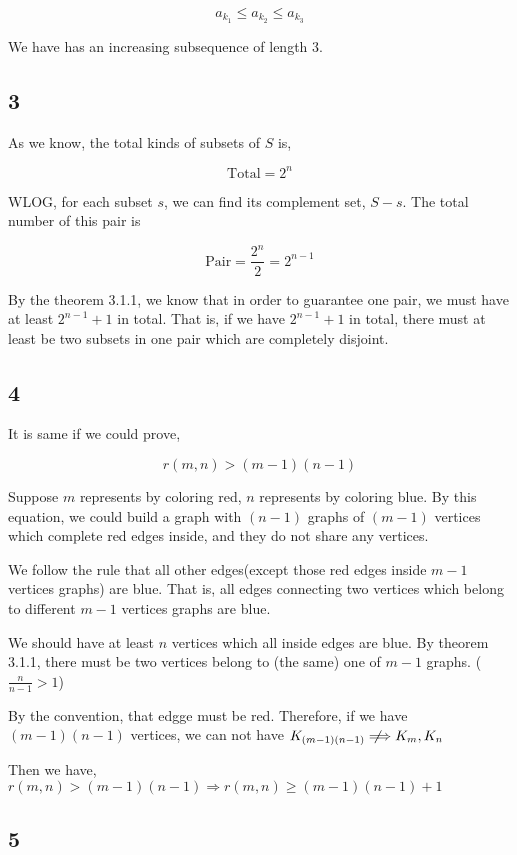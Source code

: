 \documentclass{article}
\newcommand{\notimplies}{%
  \mathrel{{\ooalign{\hidewidth$\not\phantom{=}$\hidewidth\cr$\implies$}}}}
\def\implies{\Longrightarrow}
\begin{document}
$$a_{k_1} \le a_{k_2} \le a_{k_3}$$

We have has an increasing subsequence of length 3.


\subsection*{3}

As we know, the total kinds of subsets of $S$ is,

$$\text{Total} = 2^n$$

WLOG, for each subset $s$, we can find its complement set, $S - s$. The total number of this pair is 

$$\text{Pair} = \frac{2^n}{2} = 2^{n-1}$$

By the theorem 3.1.1, we know that in order to  guarantee  one pair, we must have at least $2^{n-1} + 1$ in total. That is, if we have $2^{n-1} + 1$ in total, there must at least be two subsets in one pair which are completely disjoint.  

\subsection*{4}
It is same if we could prove,

$$r(m, n) > (m-1)(n-1)$$

Suppose $m$ represents by coloring red, $n$ represents by coloring blue. By this equation, we could build a graph with $(n-1)$ graphs of $(m-1)$ vertices which complete red edges inside, and they do not share any vertices. 

We follow the rule that all other edges(except those red edges inside $m-1$ vertices graphs) are blue. That is, all edges connecting two vertices which belong to different  $m-1$ vertices graphs are blue.

We should have at least $n$ vertices which all inside edges are blue. By theorem 3.1.1, there must be two vertices belong to (the same) one of $m-1$ graphs. ($\frac{n}{n-1} > 1$)

By the convention, that edgge must be red. Therefore, if we have $(m-1)(n-1)$ vertices, we can not have $K_{(m-1)(n-1)} \notimplies K_{m}, K_{n}$

Then we have, $r(m, n) > (m-1)(n-1) \implies r(m, n) \ge (m-1)(n-1)+1$

\subsection*{5}
\end{document}
